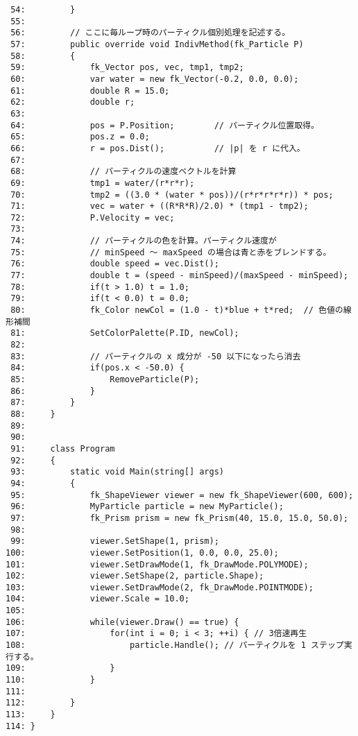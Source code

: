 \begin{breakbox}
\begin{small}
\begin{verbatim}
 54:         }
 55: 
 56:         // ここに毎ループ時のパーティクル個別処理を記述する。
 57:         public override void IndivMethod(fk_Particle P)
 58:         {
 59:             fk_Vector pos, vec, tmp1, tmp2;
 60:             var water = new fk_Vector(-0.2, 0.0, 0.0);
 61:             double R = 15.0;
 62:             double r;
 63: 
 64:             pos = P.Position;        // パーティクル位置取得。
 65:             pos.z = 0.0;
 66:             r = pos.Dist();          // |p| を r に代入。
 67: 
 68:             // パーティクルの速度ベクトルを計算
 69:             tmp1 = water/(r*r*r);
 70:             tmp2 = ((3.0 * (water * pos))/(r*r*r*r*r)) * pos;
 71:             vec = water + ((R*R*R)/2.0) * (tmp1 - tmp2);
 72:             P.Velocity = vec;
 73: 
 74:             // パーティクルの色を計算。パーティクル速度が
 75:             // minSpeed ～ maxSpeed の場合は青と赤をブレンドする。
 76:             double speed = vec.Dist();
 77:             double t = (speed - minSpeed)/(maxSpeed - minSpeed);
 78:             if(t > 1.0) t = 1.0;
 79:             if(t < 0.0) t = 0.0;
 80:             fk_Color newCol = (1.0 - t)*blue + t*red;  // 色値の線形補間
 81:             SetColorPalette(P.ID, newCol);
 82: 
 83:             // パーティクルの x 成分が -50 以下になったら消去
 84:             if(pos.x < -50.0) {
 85:                 RemoveParticle(P);
 86:             }
 87:         } 
 88:     }           
 89: 
 90: 
 91:     class Program
 92:     {
 93:         static void Main(string[] args)
 94:         {
 95:             fk_ShapeViewer viewer = new fk_ShapeViewer(600, 600);
 96:             MyParticle particle = new MyParticle();
 97:             fk_Prism prism = new fk_Prism(40, 15.0, 15.0, 50.0);
 98: 
 99:             viewer.SetShape(1, prism);
100:             viewer.SetPosition(1, 0.0, 0.0, 25.0);
101:             viewer.SetDrawMode(1, fk_DrawMode.POLYMODE);
102:             viewer.SetShape(2, particle.Shape);
103:             viewer.SetDrawMode(2, fk_DrawMode.POINTMODE);
104:             viewer.Scale = 10.0;
105:  
106:             while(viewer.Draw() == true) {
107:                 for(int i = 0; i < 3; ++i) { // 3倍速再生
108:                     particle.Handle(); // パーティクルを 1 ステップ実行する。
109:                 }
110:             }
111: 
112:         }
113:     }
114: }
\end{verbatim}
\end{small}
\end{breakbox}

